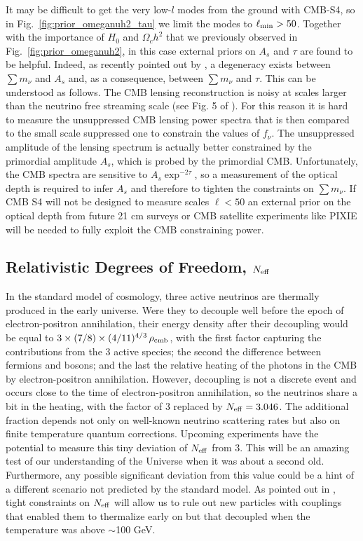 \documentclass[aps,prd,reprint,superscriptaddress]{revtex4-1}
\newcommand{\reffig}[1]{Fig.~\ref{fig:#1}}
\begin{document}
It may be difficult to get the very low-$l$ modes from the ground with CMB-S4, so in \reffig{prior_omeganuh2_tau} we limit the modes to $\ell_{\rm min}>50$. 
Together with the importance of $H_{0}$ and $\Omega_ch^2$ that we previously observed in \reffig{prior_omeganuh2}, in this case external priors on $A_{s}$ and $\tau$ are found to be helpful.
Indeed, as recently pointed out by \cite{allison:2015}, a degeneracy exists between $\sum m_\nu$ and $A_{s}$ and, as a consequence, between $\sum m_\nu$ and $\tau$. This can be understood as follows.
The CMB lensing reconstruction is noisy at scales larger than the neutrino free streaming scale (see Fig. 5 of \cite{2013arXiv1309.5383A}). For this reason it is hard to measure the unsuppressed CMB lensing power spectra that is then compared to the small scale suppressed one to constrain the values of $f_{\nu}$. The unsuppressed amplitude of the lensing spectrum is actually better constrained by the primordial amplitude $A_{s}$, which is probed by the primordial CMB. Unfortunately, the CMB spectra are sensitive to $A_{s}\exp^{-2\tau}$, so 
a measurement of the optical depth is required to infer $A_{s}$ and therefore to tighten the constraints on $\sum m_\nu$. If CMB S4 will not be designed to measure scales $\ell<50$ an external prior on the optical depth from future 21 cm surveys \cite{liu:2015} or CMB satellite experiments like PIXIE \cite{kogut:2011} will be needed to fully exploit the CMB constraining power.

\subsection{Relativistic Degrees of Freedom, $N_{\rm eff}$}

In the standard model of cosmology, three active neutrinos are thermally produced in the early universe. Were they to decouple well before the epoch of electron-positron annihilation, their energy density after their decoupling would be equal to $3\times (7/8)\times (4/11)^{4/3}\,\rho_{\rm cmb}$, with the first factor capturing the contributions from the 3 active species; the second the difference between fermions and bosons; and the last the relative heating of the photons in the CMB by electron-positron annihilation. However, decoupling is not a discrete event and occurs close to the time of electron-positron annihilation, so the neutrinos share a bit in the heating, with the factor of 3 replaced by $N_{\rm eff}=3.046$. The additional fraction depends not only on well-known neutrino scattering rates but also on finite temperature quantum corrections. 
Upcoming experiments have the potential to measure this tiny deviation of $N_{\rm eff}$ from 3. This will be an amazing test of our understanding of the Universe when it was about a second old.
Furthermore, any possible significant deviation from this value could be a hint of a different scenario not predicted by the standard model. As pointed out in \cite{baumann:2015}, tight constraints on $N_{\rm eff}$ will allow us to rule out new particles with couplings that enabled them to thermalize early on but that decoupled when the temperature was above $\sim$100 GeV.
\end{document}
